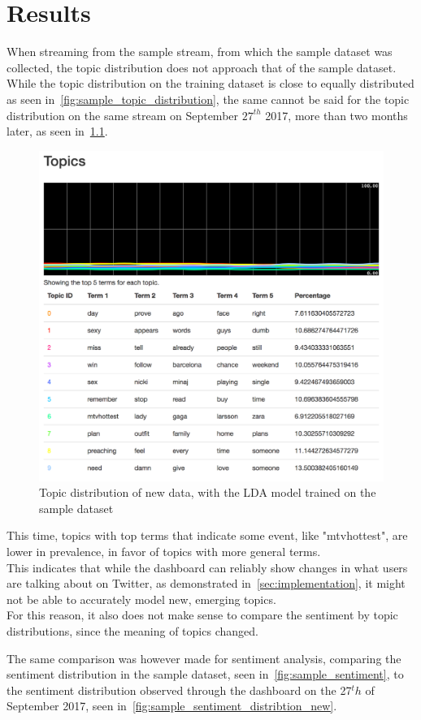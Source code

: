 \chapter{Results}
\label{ch:results}

When streaming from the sample stream, from which the sample dataset was collected,
the topic distribution does not approach that of the sample dataset.
While the topic distribution on the training dataset is close to equally distributed as seen in~\ref{fig:sample_topic_distribution},
the same cannot be said for the topic distribution on the same stream on September $27^{th}$ 2017, more than two months later,
as seen in~\ref{fig:sample_topic_distribtion_new}.

\begin{figure}
    \centering
    \caption{Topic distribution of new data, with the LDA model trained on the sample dataset}
    \label{fig:sample_topic_distribtion_new}
    \includegraphics[width=\textwidth]{../images/dashboard_topics_sample.png}
\end{figure}

This time, topics with top terms that indicate some event, like "mtvhottest", are lower in prevalence,
in favor of topics with more general terms.\\
This indicates that while the dashboard can reliably show changes in what users are talking about on Twitter,
as demonstrated in~\ref{sec:implementation}, %
it might not be able to accurately model new, emerging topics.
\\
For this reason, it also does not make sense to compare the sentiment by topic distributions,
since the meaning of topics changed.
\par
The same comparison was however made for sentiment analysis, comparing the sentiment distribution in the sample dataset, seen in~\ref{fig:sample_sentiment},
to the sentiment distribution observed through the dashboard on the 27$^th$ of September 2017, seen in~\ref{fig:sample_sentiment_distribtion_new}.

